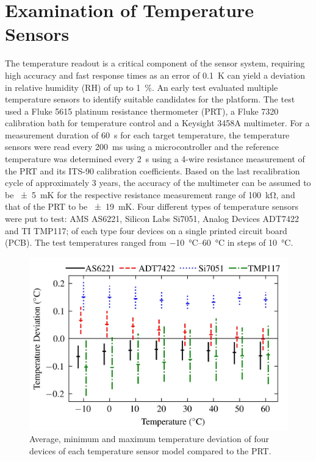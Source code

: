 \documentclass[conference,a4paper]{IEEEtran}
\newcommand{\squeezeup}{\vspace{-2mm}}
\begin{document}
\section{Examination of Temperature Sensors}
The temperature readout is a critical component of the sensor system, requiring high accuracy and fast response times as an error of \qty{0.1}{\K} can yield a deviation in relative humidity (RH) of up to \qty{1}{\percent}. An early test evaluated multiple temperature sensors to identify suitable candidates for the platform. The test used a Fluke 5615 platinum resistance thermometer (PRT), a Fluke 7320 calibration bath for temperature control and a Keysight 3458A multimeter. For a measurement duration of \qty{60}{\s} for each target temperature, the temperature sensors were read every \qty{200}{\milli\s} using a microcontroller and the reference temperature was determined every \qty{2}{\s} using a 4-wire resistance measurement of the PRT and its ITS-90 calibration coefficients. Based on the last recalibration cycle of approximately 3 years, the accuracy of the multimeter can be assumed to be \qty{\pm 5}{\milli\K} for the respective resistance measurement range of \qty{100}{\kilo\ohm}, and that of the PRT to be \qty{\pm 19}{\milli\K}. Four different types of temperature sensors were put to test: AMS AS6221, Silicon Labs Si7051, Analog Devices ADT7422 and TI TMP117; of each type four devices on a single  printed circuit board (PCB). The test temperatures ranged from \qtyrange{-10}{60}{\celsius} in steps of \qty{10}{\celsius}.

\begin{figure}
  \centering
  \includegraphics[width=\columnwidth]{graphs/tempsensors}
  \caption{Average, minimum and maximum temperature deviation of four devices of each temperature sensor model compared to the PRT.}
  \label{g:temp_dev}
  \squeezeup
\end{figure}
\end{document}
